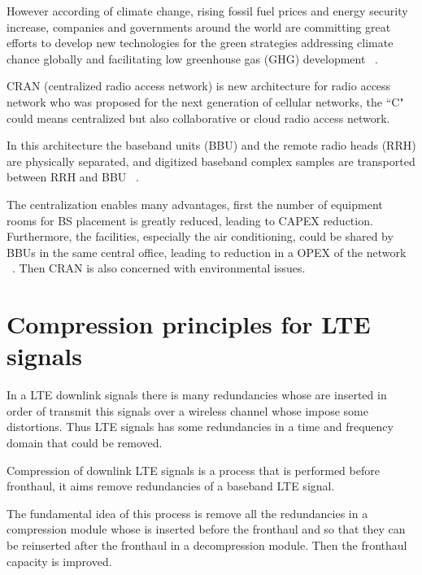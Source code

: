 \documentclass[conference,compsoc]{IEEEtran}
\begin{document}
   However according of climate change, rising fossil fuel prices and energy security increase,
   companies and governments around the world are committing great efforts to develop new 
   technologies for the green strategies addressing climate chance globally and facilitating low 
   greenhouse gas (GHG)  development ~\cite{yu2012green}.

    CRAN (centralized radio access network) is new architecture for radio access network who was 
   proposed for the  next generation of cellular networks, the ``C" could means centralized but 
   also collaborative or cloud radio access network.

   In this architecture the baseband units (BBU) and the remote radio heads (RRH) are physically 
   separated, and digitized baseband complex  samples are transported between RRH and BBU 
    ~\cite{cran_arch}.
  
   The  centralization enables many advantages, first the number of equipment rooms 
   for BS placement is greatly reduced, leading to CAPEX reduction. Furthermore, the facilities, 
   especially the air conditioning, could be shared by BBUs in the same central office, leading to 
reduction in a OPEX of the network ~\cite{quek2017cloud}. Then CRAN is also concerned with 
environmental issues.
  
  




\section{Compression principles for LTE signals }
In a LTE downlink signals there is many redundancies  whose are inserted in order of transmit this 
signals over a wireless channel whose impose some distortions. Thus LTE signals has 
some redundancies  in a time and frequency domain that could be removed.

Compression of downlink LTE signals is a process that is performed before fronthaul, it aims
remove redundancies of a baseband LTE signal. 


The fundamental idea of this process  is remove  all the 
redundancies in a compression module whose is inserted before the fronthaul and so that they can be 
reinserted after the fronthaul in  a decompression module. Then  the fronthaul capacity is improved.
\end{document}
